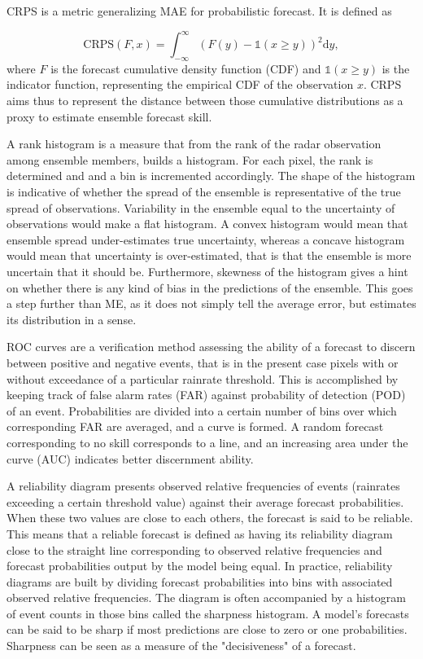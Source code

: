 CRPS is a metric generalizing MAE for probabilistic forecast. It is defined as 

\begin{equation}
	\text{CRPS}(F,x) = \int_{-\infty}^{\infty} (F(y) - \mathds{1}(x \geq y))^2 \mathrm{d}y, 
\end{equation}
%
where $F$ is the forecast cumulative density function (CDF) and $\mathds{1}(x \geq y)$ is the indicator function, representing the empirical CDF of the observation $x$. CRPS aims thus to represent the distance between those cumulative distributions as a proxy to estimate ensemble forecast skill. 

A rank histogram is a measure that from the rank of the radar observation among ensemble members, builds a histogram. For each pixel, the rank is determined and and a bin is incremented accordingly. The shape of the histogram is indicative of  whether the spread of the ensemble is representative of the true spread of observations. Variability in the ensemble equal to the uncertainty of observations would make a flat histogram. A convex histogram would mean that ensemble spread under-estimates true uncertainty, whereas a concave histogram would mean that uncertainty is over-estimated, that is that the ensemble is more uncertain that it should be. Furthermore, skewness of the histogram gives a hint on whether there is any kind of bias in the predictions of the ensemble. This goes a step further than ME, as it does not simply tell the average error, but estimates its distribution in a sense. 


ROC curves \cite{mason1982model} are a verification method assessing the ability of a forecast to discern between positive and negative events, that is in the present case pixels with or without exceedance of a particular rainrate threshold. This is accomplished by keeping track of false alarm rates (FAR) against probability of detection (POD) of an event. Probabilities are divided into a certain number of bins over which corresponding FAR are averaged, and a curve is formed. A random forecast corresponding to no skill corresponds to a line, and an increasing area under the curve (AUC) indicates better discernment ability.

A reliability diagram presents observed relative frequencies of events (rainrates exceeding a certain threshold value) against their average forecast probabilities. When these two values are close to each others, the forecast is said to be reliable. This means that a reliable forecast is defined as having its reliability diagram close to the straight line corresponding to observed relative frequencies and forecast probabilities output by the model being equal. In practice, reliability diagrams are built by dividing forecast probabilities into bins with associated observed relative frequencies. The diagram is often accompanied by a histogram of event counts in those bins called the sharpness histogram. A model's forecasts can be said to be sharp if most predictions are close to zero or one probabilities. Sharpness can be seen as a measure of the "decisiveness" of a forecast.


